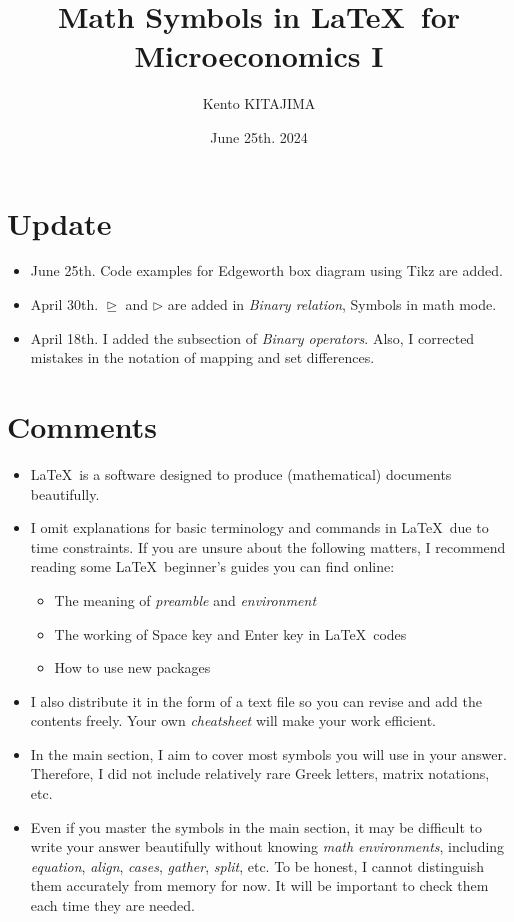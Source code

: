 \documentclass[a4paper]{article}
\title{Math Symbols in \LaTeX\ for Microeconomics I}
\author{Kento KITAJIMA}
\date{June 25th. 2024}
\begin{document}
\maketitle

\section*{Update}
\begin{itemize}
    \item June 25th. Code examples for Edgeworth box diagram using Tikz are added. 
    \item April 30th. $\trianglerighteq$ and $\triangleright$ are added in \textit{Binary relation}, Symbols in math mode.
    \item April 18th. I added the subsection of \textit{Binary operators}. Also, I corrected mistakes in the notation of mapping and set differences. 
\end{itemize}

\section*{Comments}
\begin{itemize}
    \item \LaTeX\ is a software designed to produce (mathematical) documents beautifully.
    \item I omit explanations for basic terminology and commands in \LaTeX\ due to time constraints. If you are unsure about the following matters, I recommend reading some \LaTeX\ beginner's guides you can find online:
    \begin{itemize}
        \item The meaning of \textit{preamble} and \textit{environment}
        \item The working of Space key and Enter key in \LaTeX\ codes
        \item How to use new packages
    \end{itemize}
    \item I also distribute it in the form of a text file so you can revise and add the contents freely. Your own \textit{cheatsheet} will make your work efficient.
    \item In the main section, I aim to cover most symbols you will use in your answer. Therefore, I did not include relatively rare Greek letters, matrix notations, etc. 
    \item Even if you master the symbols in the main section, it may be difficult to write your answer beautifully without knowing \textit{math environments}, including \textit{equation}, \textit{align}, \textit{cases}, \textit{gather}, \textit{split}, etc. To be honest, I cannot distinguish them accurately from memory for now. It will be important to check them each time they are needed.
\end{itemize}
\end{document}
